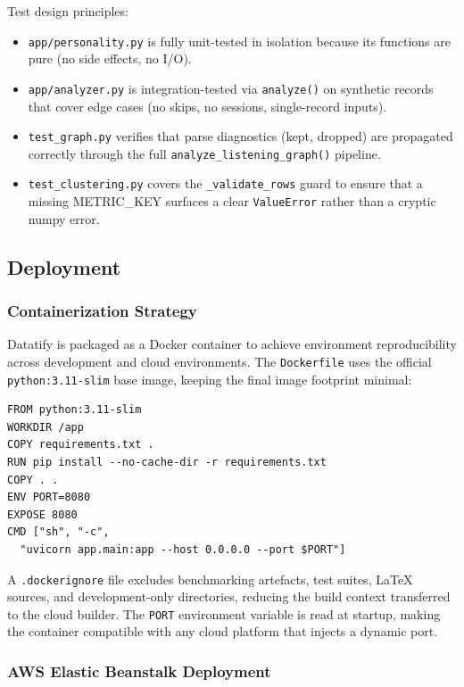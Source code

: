 \documentclass[conference]{IEEEtran}
\begin{document}
Test design principles:
\begin{itemize}
  \item \texttt{app/personality.py} is fully unit-tested in isolation because
        its functions are pure (no side effects, no I/O).
  \item \texttt{app/analyzer.py} is integration-tested via
        \texttt{analyze()} on synthetic records that cover edge cases
        (no skips, no sessions, single-record inputs).
  \item \texttt{test\_graph.py} verifies that parse diagnostics (kept,
        dropped) are propagated correctly through the full
        \texttt{analyze\_listening\_graph()} pipeline.
  \item \texttt{test\_clustering.py} covers the \texttt{\_validate\_rows}
        guard to ensure that a missing METRIC\_KEY surfaces a clear
        \texttt{ValueError} rather than a cryptic numpy error.
\end{itemize}

\subsection{Deployment}

\subsubsection{Containerization Strategy}

Datatify is packaged as a Docker container to achieve environment
reproducibility across development and cloud environments.
The \texttt{Dockerfile} uses the official \texttt{python:3.11-slim} base
image, keeping the final image footprint minimal:

\begin{verbatim}
FROM python:3.11-slim
WORKDIR /app
COPY requirements.txt .
RUN pip install --no-cache-dir -r requirements.txt
COPY . .
ENV PORT=8080
EXPOSE 8080
CMD ["sh", "-c",
  "uvicorn app.main:app --host 0.0.0.0 --port $PORT"]
\end{verbatim}

A \texttt{.dockerignore} file excludes benchmarking artefacts, test
suites, LaTeX sources, and development-only directories, reducing the
build context transferred to the cloud builder. The \texttt{PORT}
environment variable is read at startup, making the container
compatible with any cloud platform that injects a dynamic port.

\subsubsection{AWS Elastic Beanstalk Deployment}
\end{document}
